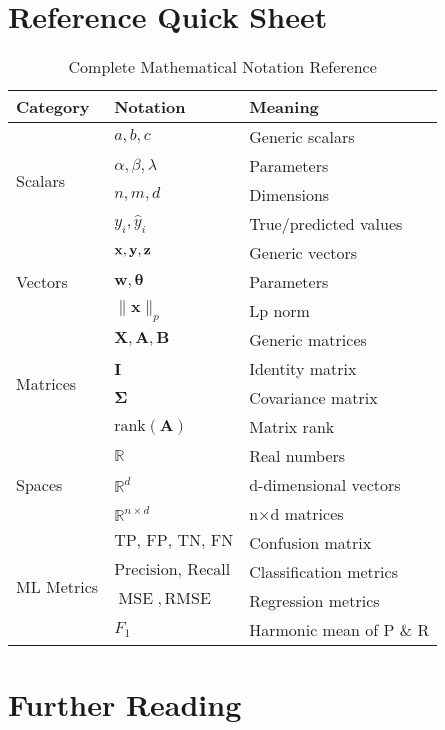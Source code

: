 \documentclass{article}
\providecommand{\vx}{\mathbf{x}}
\providecommand{\vy}{\mathbf{y}}
\providecommand{\vw}{\mathbf{w}}
\providecommand{\vtheta}{\boldsymbol{\theta}}
\providecommand{\mX}{\mathbf{X}}
\providecommand{\mA}{\mathbf{A}}
\providecommand{\mB}{\mathbf{B}}
\providecommand{\mI}{\mathbf{I}}
\providecommand{\mSigma}{\boldsymbol{\Sigma}}
\providecommand{\Real}{\mathbb{R}}
\providecommand{\MSE}{\operatorname{MSE}}
\begin{document}
\section{Reference Quick Sheet}

\begin{table}[h]
\centering
\begin{tabular}{|l|l|l|}
\hline
\textbf{Category} & \textbf{Notation} & \textbf{Meaning} \\
\hline
\multirow{4}{*}{Scalars} & $a, b, c$ & Generic scalars \\
 & $\alpha, \beta, \lambda$ & Parameters \\
 & $n, m, d$ & Dimensions \\
 & $y_i, \hat{y}_i$ & True/predicted values \\
\hline
\multirow{3}{*}{Vectors} & $\vx, \vy, \vz$ & Generic vectors \\
 & $\vw, \vtheta$ & Parameters \\
 & $\|\vx\|_p$ & Lp norm \\
\hline
\multirow{4}{*}{Matrices} & $\mX, \mA, \mB$ & Generic matrices \\
 & $\mI$ & Identity matrix \\
 & $\mSigma$ & Covariance matrix \\
 & $\text{rank}(\mA)$ & Matrix rank \\
\hline
\multirow{3}{*}{Spaces} & $\Real$ & Real numbers \\
 & $\Real^d$ & d-dimensional vectors \\
 & $\Real^{n \times d}$ & n×d matrices \\
\hline
\multirow{4}{*}{ML Metrics} & $\text{TP, FP, TN, FN}$ & Confusion matrix \\
 & $\text{Precision, Recall}$ & Classification metrics \\
 & $\MSE, \text{RMSE}$ & Regression metrics \\
 & $F_1$ & Harmonic mean of P \& R \\
\hline
\end{tabular}
\caption{Complete Mathematical Notation Reference}
\end{table}

\section{Further Reading}
\end{document}

